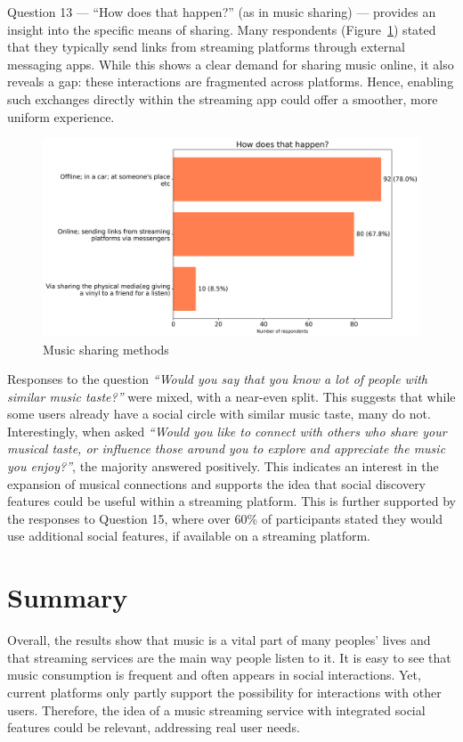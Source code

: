 Question 13 — “How does that happen?” (as in music sharing) — provides an insight into the specific means of sharing.
Many respondents (Figure~\ref{fig:sharemeth}) stated that they typically send links from streaming platforms through external messaging apps.
While this shows a clear demand for sharing music online, it also reveals a gap: these interactions are fragmented across platforms.
Hence, enabling such exchanges directly within the streaming app could offer a smoother, more uniform experience.

\begin{figure}[htbp]
    \centering
    \includegraphics[height=0.4\textheight]{charts/share method.png}
    \caption{Music sharing methods}
    \label{fig:sharemeth}
\end{figure}

Responses to the question \textit{“Would you say that you know a lot of people with similar music taste?”} were mixed,
with a near-even split.
This suggests that while some users already have a social circle with similar music taste, many do not.
Interestingly, when asked
\textit{“Would you like to connect with others who share your musical taste, or influence those around you to explore and appreciate the music you enjoy?”},
the majority answered positively.
This indicates an interest in the expansion of musical connections and supports the idea that social discovery
features could be useful within a streaming platform.
This is further supported by the responses to Question 15, where over 60\% of participants stated they would use
additional social features, if available on a streaming platform.


\section{Summary}
Overall, the results show that music is a vital part of many peoples' lives
and that streaming services are the main way people listen to it.
It is easy to see that music consumption is frequent and often appears in social interactions.
Yet, current platforms only partly support the possibility for interactions with other users.
Therefore, the idea of a music streaming service with integrated social features could be relevant,
addressing real user needs.
